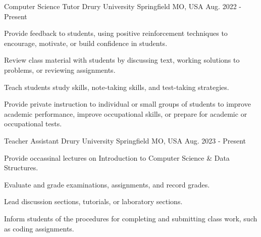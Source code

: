
\begin{cventries}

  \cventry
    {Computer Science Tutor} %
    {Drury University} %
    {Springfield MO, USA} %
    {Aug. 2022 - Present} %
    {
        \begin{cvitems}
            \item{Provide feedback to students, using positive reinforcement techniques to encourage, motivate, or build confidence in students.}
            \item{Review class material with students by discussing text, working solutions to problems, or reviewing assignments.}
            \item{Teach students study skills, note-taking skills, and test-taking strategies.}
            \item{Provide private instruction to individual or small groups of students to improve academic performance, improve occupational skills, or prepare for academic or occupational tests.}
	\end{cvitems}
}


  \cventry
    {Teacher Assistant} %
    {Drury University} %
    {Springfield MO, USA} %
    {Aug. 2023 - Present} %
    {
      \begin{cvitems} %
      \item {Provide occassinal lectures on Introduction to Computer Science \& Data Structures.}
        \item {Evaluate and grade examinations, assignments, and record grades.}
        \item {Lead discussion sections, tutorials, or laboratory sections.}
        \item {Inform students of the procedures for completing and submitting class work, such as coding assignments.}
      \end{cvitems}
    }

\end{cventries}
